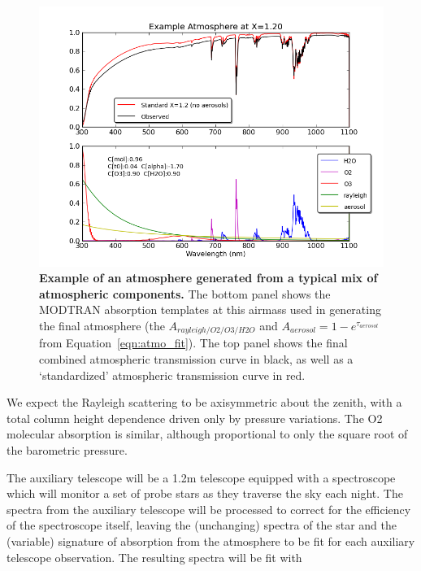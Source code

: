 \documentclass[12pt,preprint]{aastex}
\begin{document}
\begin{figure}
\centering
\includegraphics[width=6in]{atmo_airmass12}
\caption{{\small
{\bf Example of an atmosphere generated from a typical mix of
atmospheric components.} The bottom panel shows the MODTRAN absorption
templates at this airmass used in generating the final atmosphere
(the $A_{rayleigh/O2/O3/H2O}$ and $A_{aerosol} = 1-e^{\tau_{aerosol}}$ from
Equation~\ref{eqn:atmo_fit}). The top panel shows the final combined atmospheric
transmission curve in black, as well as a `standardized' atmospheric transmission
curve in red.}
\label{fig:absorption_comps2}
}
\end{figure}

We expect the Rayleigh scattering to be axisymmetric about the zenith,
with a total column height dependence driven only by pressure variations. The O2
molecular absorption is similar, although proportional to only the
square root of the barometric pressure.



The auxiliary telescope will be a 1.2m telescope equipped with a
spectroscope which will monitor a set of probe stars as they traverse
the sky each night. The spectra from the auxiliary telescope will be
processed to correct for the efficiency of the spectroscope itself,
leaving the (unchanging) spectra of the star and the (variable) signature of
absorption from the atmosphere to be fit for each auxiliary telescope
observation. The resulting spectra will be fit with 
\end{document}
